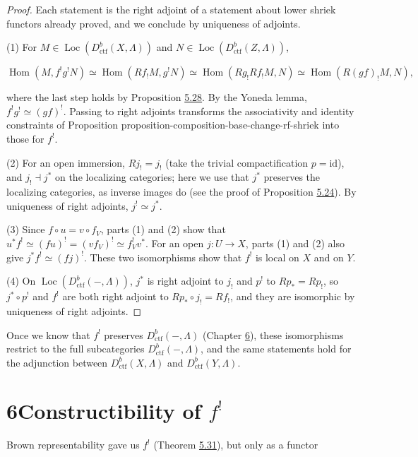 \documentclass[11pt]{article}
\providecommand{\Hom}{}\renewcommand{\Hom}{\operatorname{Hom}}
\providecommand{\Loc}{}\renewcommand{\Loc}{\operatorname{Loc}}
\begin{document}
\begin{proof}[{Proof}]\label{bp511}%
Each statement is the right adjoint of a statement about lower shriek functors already proved, and we conclude by uniqueness of adjoints.

(1) For \(M\in\Loc(D^b_{\mathrm{ctf}}(X,\Lambda))\) and \(N\in\Loc(D^b_{\mathrm{ctf}}(Z,\Lambda))\),

\[
\Hom(M,f^!g^!N)
\simeq\Hom(Rf_!M,g^!N)
\simeq\Hom(Rg_!Rf_!M,N)
\simeq\Hom(R(gf)_!M,N),
\]

where the last step holds by Proposition \hyperref[bp496]{5.28}. By the Yoneda lemma, \(f^!g^!\simeq(gf)^!\). Passing to right adjoints transforms the associativity and identity constraints of Proposition proposition-composition-base-change-rf-shriek into those for \(f^!\).

(2) For an open immersion, \(Rj_!=j_!\) (take the trivial compactification \(p=\mathrm{id}\)), and \(j_!\dashv j^*\) on the localizing categories; here we use that \(j^*\) preserves the localizing categories, as inverse images do (see the proof of Proposition \hyperref[bp488]{5.24}). By uniqueness of right adjoints, \(j^!\simeq j^*\).

(3) Since \(f\circ u=v\circ f_V\), parts (1) and (2) show that \(u^*f^!\simeq(fu)^!=(vf_V)^!\simeq f_V^!v^*\). For an open \(j:U\to X\), parts (1) and (2) also give \(j^*f^!\simeq(fj)^!\). These two isomorphisms show that \(f^!\) is local on \(X\) and on \(Y\).

(4) On \(\Loc(D^b_{\mathrm{ctf}}(-,\Lambda))\), \(j^*\) is right adjoint to \(j_!\) and \(p^!\) to \(Rp_*=Rp_!\), so \(j^*\circ p^!\) and \(f^!\) are both right adjoint to \(Rp_*\circ j_!=Rf_!\), and they are isomorphic by uniqueness of right adjoints.
\end{proof}

\label{bp512}%
Once we know that \(f^!\) preserves \(D^b_{\mathrm{ctf}}(-,\Lambda)\) (Chapter \hyperref[bp513]{6}), these isomorphisms restrict to the full subcategories \(D^b_{\mathrm{ctf}}(-,\Lambda)\), and the same statements hold for the adjunction between \(D^b_{\mathrm{ctf}}(X,\Lambda)\) and \(D^b_{\mathrm{ctf}}(Y,\Lambda)\).



\section*{\texorpdfstring{6\quad Constructibility of $f^!$}{6 Constructibility of f!}}
\label{bp513}%
\label{bp514}%
Brown representability gave us \(f^!\) (Theorem \hyperref[bp506]{5.31}), but only as a functor
\end{document}
